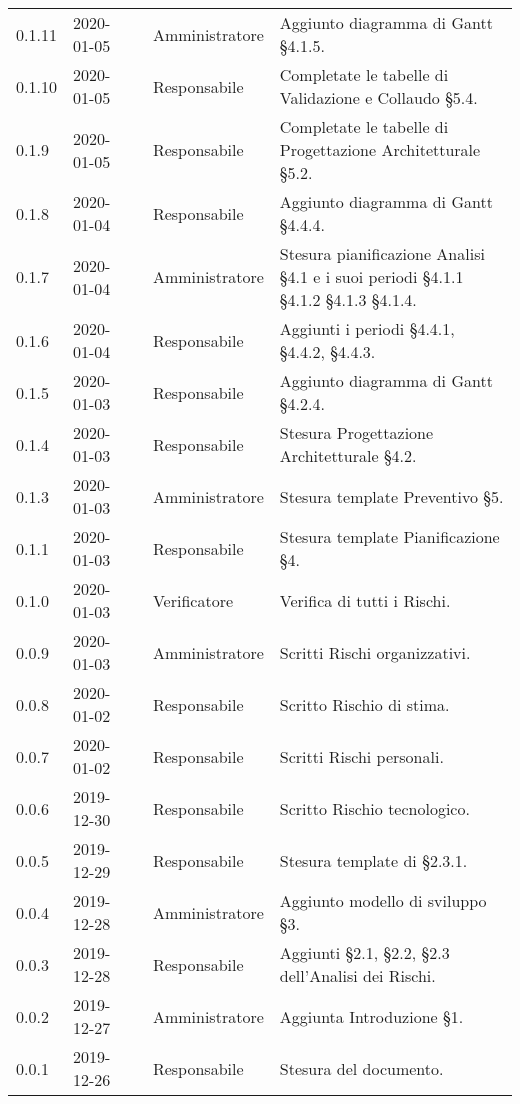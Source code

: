 {\begin{longtable}{C{2cm} C{2cm}  C{3cm}  C{3cm} C{4.5cm}}
0.1.11 & 2020-01-05 & \LD{} & Amministratore & Aggiunto diagramma di Gantt §4.1.5. \\
0.1.10 & 2020-01-05 & \SE{} & Responsabile & Completate le tabelle di Validazione e Collaudo §5.4.\\
0.1.9 & 2020-01-05 & \SE{} & Responsabile & Completate le tabelle di Progettazione Architetturale §5.2. \\
0.1.8 & 2020-01-04 & \SE{} & Responsabile & Aggiunto diagramma di Gantt §4.4.4. \\
0.1.7 & 2020-01-04 & \LD{} & Amministratore & Stesura pianificazione Analisi §4.1 e i suoi periodi §4.1.1 §4.1.2 §4.1.3 §4.1.4. \\
0.1.6 & 2020-01-04 & \SE{} & Responsabile & Aggiunti i periodi §4.4.1, §4.4.2, §4.4.3. \\
0.1.5 & 2020-01-03 & \SE{} & Responsabile & Aggiunto diagramma di Gantt §4.2.4. \\
0.1.4 & 2020-01-03 & \SE{} & Responsabile & Stesura Progettazione Architetturale §4.2.\\
0.1.3 & 2020-01-03 & \LD{} & Amministratore & Stesura template Preventivo §5. \\
0.1.1 & 2020-01-03 &  \SE{} & Responsabile & Stesura template Pianificazione §4. \\
0.1.0 & 2020-01-03 &\AT{} & Verificatore & Verifica di tutti i Rischi. \\
0.0.9 & 2020-01-03 & \LD{} & Amministratore & Scritti Rischi organizzativi. \\
0.0.8 & 2020-01-02 &  \SE{} & Responsabile & Scritto Rischio di stima. \\
0.0.7 & 2020-01-02 & \SE{} & Responsabile & Scritti Rischi personali. \\
0.0.6 & 2019-12-30 & \SE{} & Responsabile & Scritto Rischio tecnologico. \\
0.0.5 & 2019-12-29 & \SE{} & Responsabile & Stesura template di §2.3.1. \\
0.0.4 & 2019-12-28 & \LD{} & Amministratore & Aggiunto modello di sviluppo §3. \\
0.0.3 & 2019-12-28 & \SE{} & Responsabile & Aggiunti §2.1, §2.2, §2.3 dell'Analisi dei Rischi. \\
0.0.2 & 2019-12-27 & \LD{} & Amministratore & Aggiunta Introduzione §1. \\
0.0.1 & 2019-12-26 & \SE{} & Responsabile & Stesura del documento. \\
		
\end{longtable}
}